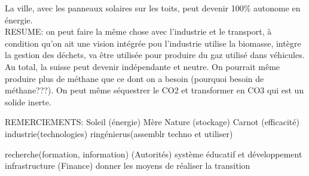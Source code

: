 \documentclass{Article}
\begin{document}
 La ville, avec les panneaux solaires sur les toits, peut devenir 100\% autonome en énergie. \\

 RESUME: on peut faire la même chose avec l'industrie et le transport, à condition qu'on ait une vision intégrée pou l'industrie utilise la biomasse, intègre la gestion des déchets, va être utilisée pour produire du gaz utilisé dans véhicules. Au total, la suisse peut devenir indépendante et neutre. On pourrait même produire plus de méthane que ce dont on a besoin (pourquoi besoin de méthane???). On peut même séquestrer le CO2 et transformer en CO3 qui est un solide inerte.

REMERCIEMENTS:
Soleil (énergie)
Mère Nature (stockage)
Carnot (efficacité)
industrie(technologies)
ringénierus(assemblr techno et utiliser)

recherche(formation, information)
(Autorités) système éducatif et développement infrastructure
(Finance) donner les moyens de réaliser la transition
\end{document}
